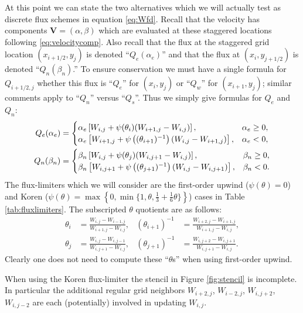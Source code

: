 \documentclass[11pt,final]{amsart}%
\newcommand\bV{\mathbf{V}}
\begin{document}
At this point we can state the two alternatives which we will actually test as discrete flux schemes in equation \eqref{eq:Wfd}.  Recall that the velocity has components $\bV=(\alpha,\beta)$ which are evaluated at these staggered locations following \eqref{eq:velocitycomp}.  Also recall that the flux at the staggered grid location $(x_{i+1/2},y_j)$ is denoted ``$Q_e(\alpha_e)$'' and that the flux at $(x_i,y_{j+1/2})$ is denoted ``$Q_n(\beta_n)$.''  To ensure conservation we must have a single formula for $Q_{i+1/2,j}$ whether this flux is ``$Q_e$'' for $(x_i,y_j)$ or ``$Q_w$'' for $(x_{i+1},y_j)$; similar comments apply to ``$Q_n$'' versus ``$Q_s$''.  Thus we simply give formulas for $Q_e$ and $Q_n$:
\begin{align}
Q_e(\alpha_e) &= \begin{cases} \alpha_e \left[W_{i,j} + \psi(\theta_{i}) (W_{i+1,j} - W_{i,j})\right], & \alpha_e \ge 0, \\ \alpha_e \left[W_{i+1,j} + \psi\left((\theta_{i+1})^{-1}\right) (W_{i,j} - W_{i+1,j})\right], & \alpha_e < 0, \end{cases} \label{eq:adfluxes} \\
Q_n(\beta_n) &= \begin{cases} \beta_n \left[W_{i,j} + \psi(\theta_{j}) (W_{i,j+1} - W_{i,j})\right], & \beta_n \ge 0, \\ \beta_n \left[W_{i,j+1} + \psi\left((\theta_{j+1})^{-1}\right) (W_{i,j} - W_{i,j+1})\right], & \beta_n < 0. \end{cases} \notag
\end{align}
The flux-limiters which we will consider are the first-order upwind ($\psi(\theta)=0$) and Koren ($\psi(\theta) = \max\left\{0,\min\{1,\theta,\frac{1}{3}+\frac{1}{6} \theta\}\right\}$) cases in Table \ref{tab:fluxlimiters}.  The subscripted $\theta$ quotients are as follows:
\begin{align*}
\theta_i &= \frac{W_{i,j}-W_{i-1,j}}{W_{i+1,j} - W_{i,j}}, & (\theta_{i+1})^{-1} &= \frac{W_{i+2,j}-W_{i+1,j}}{W_{i+1,j} - W_{i,j}}, \\
\theta_j &= \frac{W_{i,j}-W_{i,j-1}}{W_{i,j+1} - W_{i,j}}, & (\theta_{j+1})^{-1} &= \frac{W_{i,j+2}-W_{i,j+1}}{W_{i,j+1} - W_{i,j}}.
\end{align*}
Clearly one does not need to compute these ``$\theta$s'' when using first-order upwind.

When using the Koren flux-limiter the stencil in Figure \ref{fig:stencil} is incomplete.  In particular the additional regular grid neighbors $W_{i+2,j}$, $W_{i-2,j}$, $W_{i,j+2}$, $W_{i,j-2}$ are each (potentially) involved in updating $W_{i,j}$.
\end{document}
